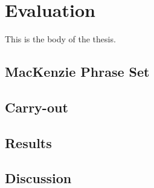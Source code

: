 \chapter{Evaluation}

This is the body of the thesis.

\section{MacKenzie Phrase Set}

\section{Carry-out}

\section{Results}

\section{Discussion}